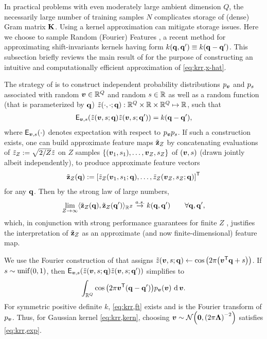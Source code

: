 In practical problems
with even moderately large ambient dimension $Q$,
the necessarily large number of training samples $N$ 
complicates storage of (dense) Gram matrix $\mathbf{K}$.
Using a kernel approximation 
can mitigate storage issues.
Here we choose
to sample Random (Fourier) Features \cite{rahimi:07:rff},
a recent method 
for approximating shift-invariants kernels
having form $k\paren{\bmq,\bmq'} \equiv k\paren{\bmq-\bmq'}$.
This subsection briefly reviews the main result of \cite{rahimi:07:rff}
for the purpose of constructing 
an intuitive and computationally efficient approximation of \eqref{eq:krr,x-hat}.

The strategy of \cite{rahimi:07:rff}
is to construct independent probability distributions 
$p_{\boldsymbol{v}}$ and $p_{s}$
associated with
random $\boldsymbol{v} \in \mathbb{R}^{Q}$ 
and random $s \in \mathbb{R}$ 
as well as a random function 
(that is parameterized by $\mathbf{q}$) 
$\zt\paren{\cdot,\cdot;\bmq} : \reals{Q} \times \real \times \reals{Q} \mapsto \real$,
such that
\begin{align}
	\expect{\bmv,s}{
		\zta{\bmv,s;\bmq}
		\zta{\bmv,s;\bmq'} 
	}
	= k(\bmq-\bmq'),
	\label{eq:krr,exp}
\end{align}
where 
$\expect{\bmv,s}{\cdot}$
denotes expectation with respect to $p_{\boldsymbol{v}}p_{s}$.
If such a construction exists,
one can build
approximate feature maps $\tilde{\mathbf{z}}_Z$
by concatenating evaluations of 
$\tilde{z}_Z:= \sqrt{2/Z}\tilde{z}$ on 
$Z$ samples 
$\set{\paren{\bmv_1,s_1},\dots,\bmv_Z,s_Z}$
of $\paren{\bmv,s}$
(drawn jointly albeit independently),
to produce approximate feature vectors
\begin{align}
	\bmztZa{\bmq} := \brac{\ztZa{\bmv_1,s_1;\bmq},\dots,\ztZa{\bmv_Z,s_Z;\bmq}}\tpose
	\label{eq:krr,feat}
\end{align}
for any $\mathbf{q}$. 
Then by the strong law of large numbers,
\begin{align}
	\lim_{Z \to \infty} \innprod{
		\bmztZa{\bmq}}{
		\bmztZa{\bmq'}
	}_{\reals{Z}} \overset{a.s.}{\to} k(\bmq,\bmq') \qquad \forall \bmq,\bmq',
	\label{eq:krr,lln}
\end{align}
which, 
in conjunction 
with strong performance guarantees
for finite $Z$ \cite{rahimi:07:rff}, 
justifies the interpretation 
of $\tilde{\mathbf{z}}_Z$ as an approximate 
(and now finite-dimensional) feature map.

We use the Fourier construction 
of \cite{rahimi:07:rff}
that assigns
$\zt\paren{\bmv,s;\bmq} 
\gets 
\cosa{2\pi\paren{\bmv\tpose \bmq + s}}$.
If $s\sim\unif{0,1}$, 
then 
$\expect{\bmv,s}{
		\zt\paren{\bmv,s;\bmq}
		\zt\paren{\bmv,s;\bmq'} 
}$
simplifies to
\begin{align}
	\int_{\reals{Q}} \cosa{2\pi\bmv\tpose\paren{\bmq-\bmq'}} \dist{\bmv}\paren{\bmv} \der{\bmv}.
	\label{eq:krr,ft}
\end{align}
For symmetric positive definite $k$,
\eqref{eq:krr,ft} exists \cite{wu:97:gbt} 
and is the Fourier transform 
of $p_{\boldsymbol{v}}$.
Thus, for Gaussian kernel \eqref{eq:krr,kern},
choosing $\bmv\sim\gauss{\boldsymbol{0}}{\paren{2\pi\bmL}^{-2}}$
satisfies \eqref{eq:krr,exp}.

